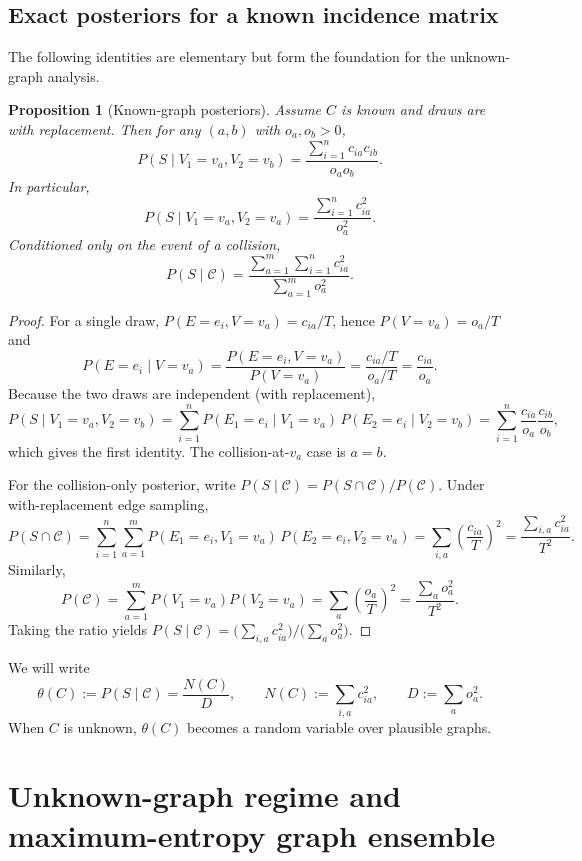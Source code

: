 \documentclass[11pt]{article}
\newcommand{\1}{\mathbf{1}}
\newcommand{\coll}{\mathcal{C}} %
\theoremstyle{plain}
\newtheorem{proposition}{Proposition}
\theoremstyle{definition}
\begin{document}
\subsection{Exact posteriors for a known incidence matrix}
The following identities are elementary but form the foundation for the unknown-graph analysis.

\begin{proposition}[Known-graph posteriors]
\label{prop:known}
Assume $C$ is known and draws are with replacement.
Then for any $(a,b)$ with $o_a,o_b>0$,
\[
P(S \mid V_1=v_a, V_2=v_b)
=
\frac{\sum_{i=1}^n c_{ia}c_{ib}}{o_a o_b}.
\]
In particular,
\[
P(S\mid V_1=v_a, V_2=v_a) = \frac{\sum_{i=1}^n c_{ia}^2}{o_a^2}.
\]
Conditioned only on the event of a collision,
\[
\boxed{
P(S\mid \coll)
=
\frac{\sum_{a=1}^m\sum_{i=1}^n c_{ia}^2}{\sum_{a=1}^m o_a^2}.
}
\]
\end{proposition}

\begin{proof}
For a single draw, $P(E=e_i, V=v_a)=c_{ia}/T$, hence $P(V=v_a)=o_a/T$ and
\[
P(E=e_i \mid V=v_a)=\frac{P(E=e_i,V=v_a)}{P(V=v_a)}=\frac{c_{ia}/T}{o_a/T}=\frac{c_{ia}}{o_a}.
\]
Because the two draws are independent (with replacement),
\[
P(S \mid V_1=v_a,V_2=v_b)
= \sum_{i=1}^n P(E_1=e_i\mid V_1=v_a)\,P(E_2=e_i\mid V_2=v_b)
= \sum_{i=1}^n \frac{c_{ia}}{o_a}\frac{c_{ib}}{o_b},
\]
which gives the first identity. The collision-at-$v_a$ case is $a=b$.

For the collision-only posterior, write $P(S\mid \coll)=P(S\cap \coll)/P(\coll)$.
Under with-replacement edge sampling,
\[
P(S\cap \coll)=\sum_{i=1}^n\sum_{a=1}^m P(E_1=e_i,V_1=v_a)\,P(E_2=e_i,V_2=v_a)
= \sum_{i,a}\left(\frac{c_{ia}}{T}\right)^2=\frac{\sum_{i,a}c_{ia}^2}{T^2}.
\]
Similarly,
\[
P(\coll)=\sum_{a=1}^m P(V_1=v_a)P(V_2=v_a)=\sum_a\left(\frac{o_a}{T}\right)^2=\frac{\sum_a o_a^2}{T^2}.
\]
Taking the ratio yields $P(S\mid \coll)=\bigl(\sum_{i,a}c_{ia}^2\bigr)\big/\bigl(\sum_a o_a^2\bigr)$.
\end{proof}

We will write
\[
\theta(C) := P(S\mid \coll)
=
\frac{N(C)}{D},
\qquad
N(C) := \sum_{i,a} c_{ia}^2,
\qquad
D := \sum_{a} o_a^2.
\]
When $C$ is unknown, $\theta(C)$ becomes a random variable over plausible graphs.

\section{Unknown-graph regime and maximum-entropy graph ensemble}
\end{document}
